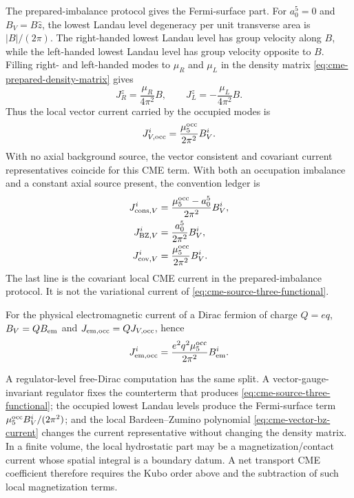 The prepared-imbalance protocol gives the Fermi-surface part.  For
\(a_0^5=0\) and \(B_V=B\hat z\), the lowest Landau level degeneracy per unit
transverse area is \(|B|/(2\pi)\).  The right-handed lowest Landau level has
group velocity along \(B\), while the left-handed lowest Landau level has
group velocity opposite to \(B\).  Filling right- and left-handed modes to
\(\mu_R\) and \(\mu_L\) in the density matrix
\eqref{eq:cme-prepared-density-matrix} gives
\[
  J_R^z=\frac{\mu_R}{4\pi^2}B,\qquad
  J_L^z=-\frac{\mu_L}{4\pi^2}B .
\]
Thus the local vector current carried by the occupied modes is
\begin{equation}
  J_{V,{\rm occ}}^i
  =
  \frac{\mu_5^{\rm occ}}{2\pi^2}B_V^i .
  \label{eq:cme-prepared-imbalance-current}
\end{equation}
With no axial background source, the vector consistent and covariant current
representatives coincide for this CME term.  With both an occupation
imbalance and a constant axial source present, the convention ledger is
\begin{equation}
\begin{aligned}
  J_{{\rm cons},V}^i
  &=
  \frac{\mu_5^{\rm occ}-a_0^5}{2\pi^2}B_V^i,\\
  J_{{\rm BZ},V}^i
  &=
  \frac{a_0^5}{2\pi^2}B_V^i,\\
  J_{{\rm cov},V}^i
  &=
  \frac{\mu_5^{\rm occ}}{2\pi^2}B_V^i .
\end{aligned}
  \label{eq:cme-consistent-covariant-ledger}
\end{equation}
The last line is the covariant local CME current in the prepared-imbalance
protocol.  It is not the variational current of
\eqref{eq:cme-source-three-functional}.

For the physical electromagnetic current of a Dirac fermion of charge
\(Q=eq\), \(B_V=Q B_{\rm em}\) and
\(J_{{\rm em},{\rm occ}}=QJ_{V,{\rm occ}}\), hence
\begin{equation}
  J_{{\rm em},{\rm occ}}^i
  =
  \frac{e^2q^2\mu_5^{\rm occ}}{2\pi^2}B_{\rm em}^i .
  \label{eq:cme-electromagnetic-current}
\end{equation}

A regulator-level free-Dirac computation has the same split.  A
vector-gauge-invariant regulator fixes the counterterm that produces
\eqref{eq:cme-source-three-functional}; the occupied lowest Landau levels
produce the Fermi-surface term \(\mu_5^{\rm occ}B_V^i/(2\pi^2)\); and the
local Bardeen--Zumino polynomial \eqref{eq:cme-vector-bz-current} changes the
current representative without changing the density matrix.  In a finite
volume, the local hydrostatic part may be a magnetization/contact current
whose spatial integral is a boundary datum.  A net transport CME coefficient
therefore requires the Kubo order above and the subtraction of such local
magnetization terms.

